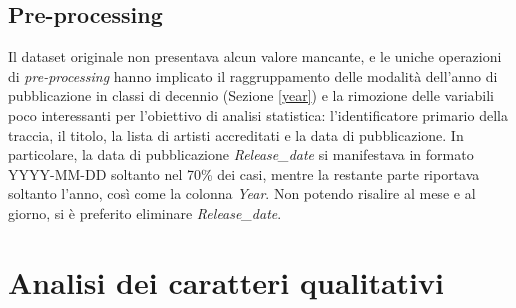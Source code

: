 \documentclass[fleqn,10pt]{SelfArx} %
\begin{document}
\subsection{Pre-processing}
Il dataset originale non presentava alcun valore mancante, e le uniche operazioni di \textit{pre-processing} hanno implicato il raggruppamento delle modalità dell'anno di pubblicazione in classi di decennio (Sezione \ref{year}) e la rimozione delle variabili poco interessanti per l'obiettivo di analisi statistica: l'identificatore primario della traccia, il titolo, la lista di artisti accreditati e la data di pubblicazione. In particolare, la data di pubblicazione \textit{Release\_date} si manifestava in formato YYYY-MM-DD soltanto nel 70\% dei casi, mentre la restante parte riportava soltanto l'anno, così come la colonna \textit{Year}. Non potendo risalire al mese e al giorno, si è preferito eliminare \textit{Release\_date}.
\section{Analisi dei caratteri qualitativi}\label{cqual}
\end{document}
